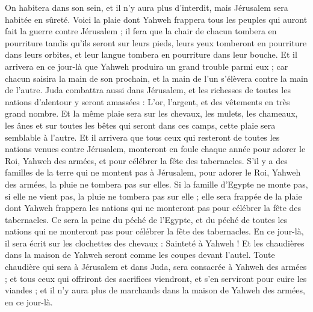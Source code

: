 \begin{multicols}{2}
On habitera dans son sein, et il n'y aura plus d'interdit, mais Jérusalem sera habitée en sûreté.
Voici la plaie dont Yahweh frappera tous les peuples qui auront fait la guerre contre Jérusalem ; il fera que la chair de chacun tombera en pourriture tandis qu'ils seront sur leurs pieds, leurs yeux tomberont en pourriture dans leurs orbites, et leur langue tombera en pourriture dans leur bouche.
Et il arrivera en ce jour-là que Yahweh produira un grand trouble parmi eux ; car chacun saisira la main de son prochain, et la main de l'un s'élèvera contre la main de l'autre.
Juda combattra aussi dans Jérusalem, et les richesses de toutes les nations d'alentour y seront amassées : L'or, l'argent, et des vêtements en très grand nombre.
Et la même plaie sera sur les chevaux, les mulets, les chameaux, les ânes et sur toutes les bêtes qui seront dans ces camps, cette plaie sera semblable à l'autre.
Et il arrivera que tous ceux qui resteront de toutes les nations venues contre Jérusalem, monteront en foule chaque année pour adorer le Roi, Yahweh des armées, et pour célébrer la fête des tabernacles.
S'il y a des familles de la terre qui ne montent pas à Jérusalem, pour adorer le Roi, Yahweh des armées, la pluie ne tombera pas sur elles.
Si la famille d'Egypte ne monte pas, si elle ne vient pas, la pluie ne tombera pas sur elle ; elle sera frappée de la plaie dont Yahweh frappera les nations qui ne monteront pas pour célébrer la fête des tabernacles.
Ce sera la peine du péché de l'Egypte, et du péché de toutes les nations qui ne monteront pas pour célébrer la fête des tabernacles.
En ce jour-là, il sera écrit sur les clochettes des chevaux : Sainteté à Yahweh ! Et les chaudières dans la maison de Yahweh seront comme les coupes devant l'autel.
Toute chaudière qui sera à Jérusalem et dans Juda, sera consacrée à Yahweh des armées ; et tous ceux qui offriront des sacrifices viendront, et s'en serviront pour cuire les viandes ; et il n'y aura plus de marchands dans la maison de Yahweh des armées, en ce jour-là.
\PPE{}
\end{multicols}
